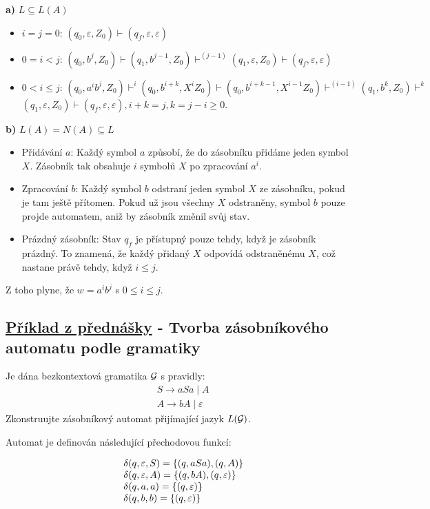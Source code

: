 \textbf{a)} $L \subseteq L(A)$
\begin{itemize}[leftmargin=*]
    \item $i=j=0 \text{: } (q_0, \varepsilon, Z_0) \vdash (q_f, \varepsilon, \varepsilon)$
    \item $0=i < j \text{: } (q_0, b^j, Z_0) \vdash (q_1, b^{j-1}, Z_0) \vdash^{(j-1)} (q_1, \varepsilon, Z_0) 
    \vdash (q_f, \varepsilon, \varepsilon)$
    \item $0<i \leq j \text{: } (q_0, a^i b^j, Z_0) \vdash^i (q_0, b^{i+k}, X^i Z_0) \vdash (q_0, b^{i+k-1}, X^{i-1} Z_0)
    \vdash^{(i-1)} (q_1, b^k, Z_0) \vdash^k$ \\ $(q_1, \varepsilon, Z_0) \vdash (q_f, \varepsilon, \varepsilon),
    i+k = j, k=j-i \geq 0$.
\end{itemize}
\textbf{b)} $L(A) = N(A) \subseteq L$
\begin{itemize}[leftmargin=*,noitemsep]
    \item Přidávání $a$:
    Každý symbol $a$ způsobí, že do zásobníku přidáme jeden symbol $X$. Zásobník tak obsahuje $i$ symbolů $X$ po 
    zpracování $a^i$.
    \item Zpracování $b$:
    Každý symbol $b$ odstraní jeden symbol $X$ ze zásobníku, pokud je tam ještě přítomen. Pokud už jsou všechny $X$ 
    odstraněny, symbol $b$ pouze projde automatem, aniž by zásobník změnil svůj stav.
    \item Prázdný zásobník:
    Stav $q_f$ je přístupný pouze tehdy, když je zásobník prázdný. To znamená, že každý přidaný $X$ odpovídá 
    odstraněnému $X$, což nastane právě tehdy, když $i \leq j$.
\end{itemize}
Z toho plyne, že $w = a^i b^j$ s $0 \leq i \leq j$.

\subsection{\href{https://youtu.be/9zpbNd1Yqnc?list=PLQL6z4JeTTQkLuzI78OTnfYBclE1g0UjS&t=1621}{Příklad z přednášky} - Tvorba zásobníkového automatu podle gramatiky} 
Je dána bezkontextová gramatika $\mathcal{G}$ s pravidly:
\begin{align*}
    &S \rightarrow aSa \mid A \\
    &A \rightarrow bA \mid \varepsilon
\end{align*}
Zkonstruujte zásobníkový automat přijímající jazyk $L(\mathcal{G})$.

Automat je definován následující přechodovou funkcí: 

\[
\begin{array}{l l}
    & \delta(q, \varepsilon, S) = \left\lbrace (q, aSa), (q, A) \right\rbrace \\
    & \delta(q, \varepsilon, A) = \left\lbrace (q, bA), (q, \varepsilon) \right\rbrace \\
    & \delta(q, a, a) = \left\lbrace (q, \varepsilon) \right\rbrace \\
    & \delta(q, b, b) = \left\lbrace (q, \varepsilon) \right\rbrace \\ 
\end{array}
\]

